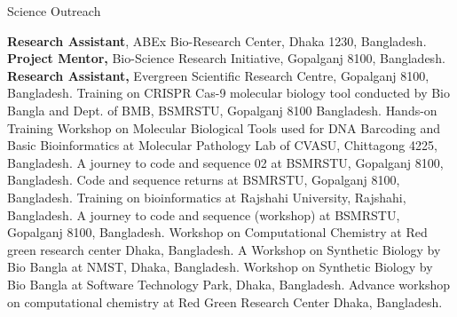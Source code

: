 \begin{rubric}{Science Outreach}

\entry*[Jan 2021-] \textbf{Research Assistant}, ABEx Bio-Research Center, Dhaka 1230, Bangladesh.
%
\entry*[Mar 2020 -] \textbf{Project Mentor,}  Bio-Science Research Initiative, Gopalganj 8100, Bangladesh.
%
\entry*[Jan 2018 -] \textbf{Research Assistant,}  Evergreen Scientific Research Centre, Gopalganj 8100, Bangladesh.
\entry*[Mar 29, 2020] \textbf{}Training on CRISPR Cas-9 molecular biology tool conducted by Bio Bangla and Dept. of BMB, BSMRSTU, Gopalganj 8100 Bangladesh.
%
\entry*[Mar 08, 2019] \textbf{}Hands-on Training Workshop on Molecular Biological Tools used for DNA Barcoding and Basic Bioinformatics at Molecular Pathology Lab of CVASU, Chittagong 4225, Bangladesh.
\entry*[Apr 22, 2018] \textbf{}A journey to code and sequence 02 at BSMRSTU, Gopalganj 8100, Bangladesh.
%
\entry*[Apr 06, 2018] \textbf{}Code and sequence returns at BSMRSTU, Gopalganj 8100, Bangladesh.
%
\entry*[Feb 10, 2018] \textbf{}Training on bioinformatics at Rajshahi University, Rajshahi, Bangladesh.
%
\entry*[Jan 02, 2018] \textbf{}A journey to code and sequence (workshop) at BSMRSTU, Gopalganj 8100, Bangladesh.
%
\entry*[Oct 29, 2017] \textbf{}Workshop on Computational Chemistry at Red green research center Dhaka, Bangladesh.
%
\entry*[Sep 11, 2017] \textbf{}A Workshop on Synthetic Biology by Bio Bangla at NMST, Dhaka, Bangladesh.
%
\entry*[Aug 06, 2017] \textbf{}Workshop on Synthetic Biology by Bio Bangla at Software Technology Park, Dhaka, Bangladesh.
%
\entry*[Apr 11, 2017] \textbf{}Advance workshop on computational chemistry at Red Green Research Center Dhaka, Bangladesh.

\end{rubric}